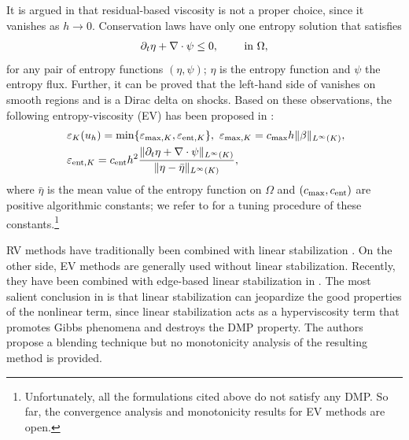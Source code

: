 It is argued in \cite[Remark 2.2]{guermond_entropy_2011} that residual-based viscosity is not a proper choice, since it vanishes
as $h \rightarrow 0$. Conservation laws have only one entropy solution 
\cite{lefloch_hyperbolic_2002} that satisfies 
\begin{align}\label{eq-entinq}
\partial_t \eta + \nabla \cdot \psi \leq 0, \qquad \hbox{ in } \Omega, 
\end{align}
for any pair of entropy functions $(\eta,\psi)$; $\eta$ is the entropy function and $\psi$ the entropy flux. Further, it can be proved that the left-hand side of  vanishes on smooth regions and is a Dirac delta on shocks. Based on these observations, the following entropy-viscosity (EV) has been proposed in \cite{guermond_entropy_2011}:
\begin{align}\label{eq-ev}%
&\varepsilon_K(u_h) = \min \{ \varepsilon_{{\rm max},K}, \varepsilon_{{\rm ent},K}\}, \mbox{ }
\varepsilon_{{\rm max},K} = c_{\rm max} h \|\beta\|_{L^\infty(K)}, \\\mbox{ }
&\varepsilon_{{\rm ent},K} = c_{\rm ent} h^2 \frac{\|\partial_t \eta + \nabla \cdot \psi\|_{L^\infty(K)}}{\|\eta - \bar{\eta}  \|_{L^\infty(K)}},
\end{align}
where $\bar{\eta}$ is the mean value of the entropy function on $\Omega$ and $(c_{\rm max},c_{\rm ent})$ are positive algorithmic constants; we refer to \cite{guermond_entropy_2011} for a tuning procedure of these constants.\footnote{Unfortunately, all the formulations cited above do not satisfy any DMP. So far, the convergence analysis and monotonicity results for EV methods are open.} %

RV methods have traditionally been combined with linear stabilization \cite{codina_discontinuity-capturing_1993,john_spurious_2007,john_spurious_2008,galeao_consistent_1988,gomes_dutra_do_carmo_feedback_1991}. 
On the other side, EV methods are generally used without linear stabilization. Recently, they have been combined with edge-based linear stabilization in \cite{ern_weighting_2012}. The most salient conclusion in \cite{ern_weighting_2012} is that linear 
stabilization can jeopardize the good properties of the nonlinear term, since linear stabilization acts as a hyperviscosity term that promotes Gibbs phenomena and 
destroys the DMP property. The authors propose a blending technique but no monotonicity analysis of the resulting method is provided.

